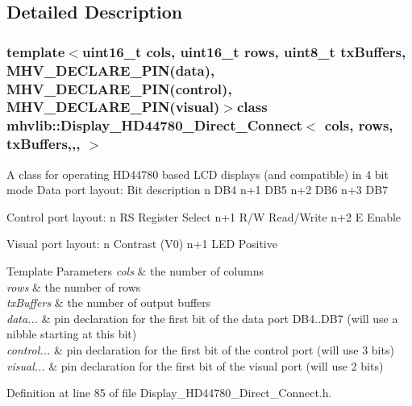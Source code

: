 \subsection{Detailed Description}
\subsubsection*{template$<$uint16\-\_\-t cols, uint16\-\_\-t rows, uint8\-\_\-t tx\-Buffers, M\-H\-V\-\_\-\-D\-E\-C\-L\-A\-R\-E\-\_\-\-P\-I\-N(data), M\-H\-V\-\_\-\-D\-E\-C\-L\-A\-R\-E\-\_\-\-P\-I\-N(control), M\-H\-V\-\_\-\-D\-E\-C\-L\-A\-R\-E\-\_\-\-P\-I\-N(visual)$>$class mhvlib\-::\-Display\-\_\-\-H\-D44780\-\_\-\-Direct\-\_\-\-Connect$<$ cols, rows, tx\-Buffers,,, $>$}

A class for operating H\-D44780 based L\-C\-D displays (and compatible) in 4 bit mode Data port layout\-: Bit description n D\-B4 n+1 D\-B5 n+2 D\-B6 n+3 D\-B7

Control port layout\-: n R\-S Register Select n+1 R/\-W Read/\-Write n+2 E Enable

Visual port layout\-: n Contrast (V0) n+1 L\-E\-D Positive


\begin{DoxyTemplParams}{Template Parameters}
{\em cols} & the number of columns \\
\hline
{\em rows} & the number of rows \\
\hline
{\em tx\-Buffers} & the number of output buffers \\
\hline
{\em data...} & pin declaration for the first bit of the data port D\-B4..D\-B7 (will use a nibble starting at this bit) \\
\hline
{\em control...} & pin declaration for the first bit of the control port (will use 3 bits) \\
\hline
{\em visual...} & pin declaration for the first bit of the visual port (will use 2 bits) \\
\hline
\end{DoxyTemplParams}


Definition at line 85 of file Display\-\_\-\-H\-D44780\-\_\-\-Direct\-\_\-\-Connect.\-h.



